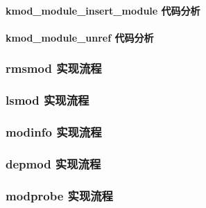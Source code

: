\documentclass[11pt,a4paper]{article}
\begin{document}
\paragraph{kmod\_module\_insert\_module 代码分析}

\paragraph{kmod\_module\_unref 代码分析}

\subsubsection{rmsmod 实现流程}

\subsubsection{lsmod 实现流程}

\subsubsection{modinfo 实现流程}

\subsubsection{depmod 实现流程}

\subsubsection{modprobe 实现流程}
\end{document}
